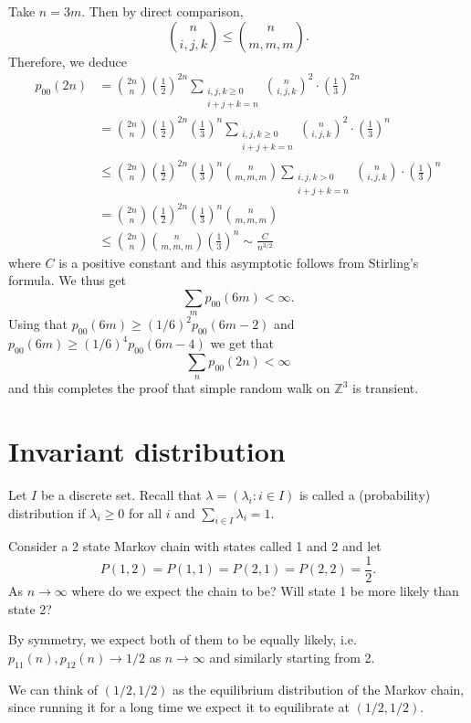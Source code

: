 \documentclass[a4paper]{article}
\begin{document}
Take $n=3 m$. Then by direct comparison,
\[
\binom{n}{i,j,k} \leq\binom{n}{m,m,m} .
\]
Therefore, we deduce
\begin{align*}
    p_{00}(2 n)&= \binom{2n}{n}\left(\frac{1}{2}\right)^{2 n} \sum_{\substack{i, j, k \geq 0 \\
i+j+k=n}}\binom{n}{i,j,k}^2 \cdot\left(\frac{1}{3}\right)^{2 n}\\ 
&= \binom{2n}{n}\left(\frac{1}{2}\right)^{2 n} \left(\frac{1}{3}\right)^{n}\sum_{\substack{i, j, k \geq 0 \\
i+j+k=n}}\binom{n}{i,j,k}^2 \cdot\left(\frac{1}{3}\right)^{n} \\ 
&\le \binom{2n}{n}\left(\frac{1}{2}\right)^{2 n} \left(\frac{1}{3}\right)^{n} \binom{n}{m,m,m}\sum_{\substack{i, j, k>0 \\
i+j+k=n}}\binom{n}{i,j,k} \cdot\left(\frac{1}{3}\right)^n \\ 
&= \binom{2n}{n}\left(\frac{1}{2}\right)^{2 n} \left(\frac{1}{3}\right)^{n} \binom{n}{m,m,m} \\
&\leq\binom{2n}{n}\binom{n}{m,m,m}\left(\frac{1}{3}\right)^n \sim \frac{C}{n^{3 / 2}}
\end{align*}
where $C$ is a positive constant and this asymptotic follows from Stirling's formula. We thus get
\[
\sum_m p_{00}(6 m)<\infty .
\]
Using that $p_{00}(6 m) \geq(1 / 6)^2 p_{00}(6 m-2)$ and $p_{00}(6 m) \geq(1 / 6)^4 p_{00}(6 m-4)$ we get that
\[
\sum_n p_{00}(2 n)<\infty
\]
and this completes the proof that simple random walk on $\mathbb{Z}^3$ is transient.

\section{Invariant distribution}
Let $I$ be a discrete set. Recall that $\lambda=\left(\lambda_i: i \in I\right)$ is called a (probability) distribution if $\lambda_i \geq 0$ for all $i$ and $\sum_{i \in I} \lambda_i=1$.

\begin{example}
    Consider a 2 state Markov chain with states called 1 and 2 and let
    \[
    P(1,2)=P(1,1)=P(2,1)=P(2,2)=\frac{1}{2} .
    \]
    As $n \rightarrow \infty$ where do we expect the chain to be? Will state 1 be more likely than state 2? 
    
    By symmetry, we expect both of them to be equally likely, i.e. $p_{11}(n),p_{12}(n) \rightarrow 1 / 2$ as $n \rightarrow \infty$ and similarly starting from 2.

    We can think of $(1 / 2,1 / 2)$ as the equilibrium distribution of the Markov chain, since running it for a long time we expect it to equilibrate at $(1 / 2,1 / 2)$.
\end{example}
\end{document}
